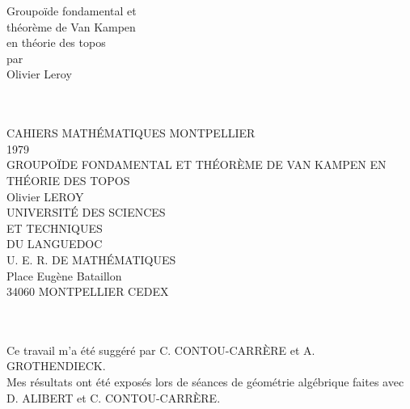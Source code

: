 \documentclass[12pt,twoside]{report} %
\theoremstyle{plain}
\theoremstyle{definition}
\begin{document}
\setcounter{tocdepth}{2}
\sloppy


\thispagestyle{empty}
\noindent\makebox[\linewidth]{\rule{4in}{0.01in}}
\vspace*{\fill}
\begin{center}
    {\Huge Groupoïde fondamental et} \\
    \vspace{0.5em}
    {\Huge théorème de Van Kampen} \\
    \vspace{0.5em}
    {\Huge en théorie des topos} \\
    \vspace{0.5em}
    {\Large par} \\
    \vspace{0.5em}
    {\huge Olivier Leroy}
\end{center}
\vspace*{\fill}
\noindent\makebox[\linewidth]{\rule{4in}{0.01in}}

\newpage
\thispagestyle{empty}
\begin{center}
\setlength{\baselineskip}{24pt}
\  \\
{
\ \\
[0.5in] CAHIERS MATHÉMATIQUES MONTPELLIER \\ 1979 \\
[1.5in] {\large GROUPOÏDE FONDAMENTAL ET THÉORÈME DE VAN KAMPEN EN THÉORIE DES TOPOS \\ Olivier LEROY} \\
[2in] UNIVERSITÉ DES SCIENCES \\ ET TECHNIQUES \\ DU LANGUEDOC \\ U. E. R. DE MATHÉMATIQUES \\
Place Eugène Bataillon \\ 34060 MONTPELLIER CEDEX 
}
\end{center}
\vfill
\vfill
\vfill


\newpage

\begin{center}
\thispagestyle{empty}
\setlength{\baselineskip}{24pt}
\  \\
{\large
\ \\
[3in] Ce travail m'a été suggéré par C. CONTOU-CARRÈRE et A. GROTHENDIECK. \\
Mes résultats ont été exposés lors de séances de géométrie algébrique faites avec D. ALIBERT et C. CONTOU-CARRÈRE. \\
}
\vfill
\end{center}
\vfill
\end{document}

